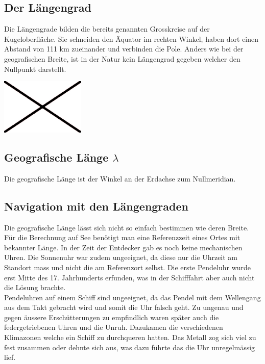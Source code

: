 \begin{refsection}
\section{Der Längengrad}
Die Längengrade bilden die bereits genannten Grosskreise auf der Kugeloberfläche.
Sie schneiden den Äquator im rechten Winkel, haben dort einen Abstand von 111 km zueinander und verbinden die Pole. Anders wie bei der geografischen Breite, ist in der Natur kein Längengrad gegeben welcher den Nullpunkt darstellt.

\begin{center}
        \includegraphics[width=0.3\textwidth]{kugel/Beispielbild.jpg}
\end{center}


\subsection{Geografische Länge $\lambda$}
\begin{definition}
Die geografische Länge ist der Winkel an der Erdachse zum Nullmeridian.
\end{definition}

\subsection{Navigation mit den Längengraden}
Die geografische Länge lässt sich nicht so einfach bestimmen wie deren Breite. Für die Berechnung auf See benötigt man eine Referenzzeit eines Ortes mit bekannter Länge.
In der Zeit der Entdecker gab es noch keine mechanischen Uhren. Die Sonnenuhr war zudem ungeeignet, da diese nur die Uhrzeit am Standort mass und nicht die am Referenzort selbst. Die erste Pendeluhr wurde erst Mitte des 17. Jahrhunderts erfunden, was in der Schifffahrt aber auch nicht die Lösung brachte.\\
Pendeluhren auf einem Schiff sind ungeeignet, da das Pendel mit dem Wellengang aus dem Takt gebracht wird und somit die Uhr falsch geht.
Zu ungenau und gegen äussere Erschütterungen zu empfindlich waren später auch die federgetriebenen Uhren und die Unruh. Dazukamen die verschiedenen Klimazonen welche ein Schiff zu durchqueren hatten. Das Metall zog sich viel zu fest zusammen oder dehnte sich aus, was dazu führte das die Uhr unregelmässig lief.


\end{refsection}
